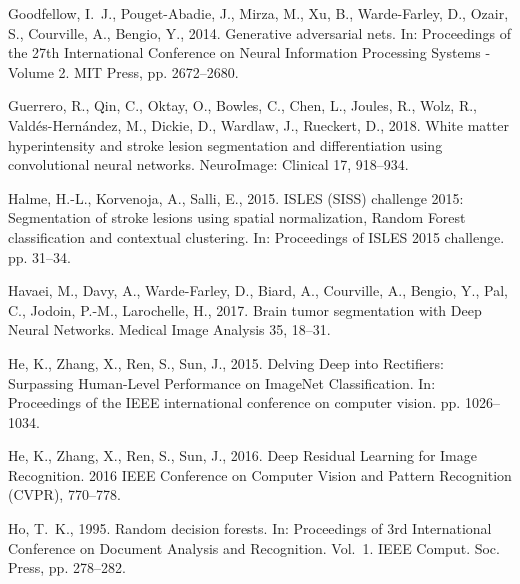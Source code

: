 \documentclass[letterpaper,final,authoryear,3p,times,twocolumn]{elsarticle}
\begin{document}
\begin{thebibliography}{36}
Goodfellow, I.~J., Pouget-Abadie, J., Mirza, M., Xu, B., Warde-Farley, D.,
  Ozair, S., Courville, A., Bengio, Y., 2014. {Generative adversarial nets}.
  In: Proceedings of the 27th International Conference on Neural Information
  Processing Systems - Volume 2. MIT Press, pp. 2672--2680.

Guerrero, R., Qin, C., Oktay, O., Bowles, C., Chen, L., Joules, R., Wolz, R.,
  Vald{\'{e}}s-Hern{\'{a}}ndez, M., Dickie, D., Wardlaw, J., Rueckert, D.,
  2018. {White matter hyperintensity and stroke lesion segmentation and
  differentiation using convolutional neural networks}. NeuroImage: Clinical
  17, 918--934.

Halme, H.-L., Korvenoja, A., Salli, E., 2015. {ISLES (SISS) challenge 2015:
  Segmentation of stroke lesions using spatial normalization, Random Forest
  classification and contextual clustering}. In: Proceedings of ISLES 2015
  challenge. pp. 31--34.

Havaei, M., Davy, A., Warde-Farley, D., Biard, A., Courville, A., Bengio, Y.,
  Pal, C., Jodoin, P.-M., Larochelle, H., 2017. {Brain tumor segmentation with
  Deep Neural Networks}. Medical Image Analysis 35, 18--31.

He, K., Zhang, X., Ren, S., Sun, J., 2015. {Delving Deep into Rectifiers:
  Surpassing Human-Level Performance on ImageNet Classification}. In:
  Proceedings of the IEEE international conference on computer vision. pp.
  1026--1034.

He, K., Zhang, X., Ren, S., Sun, J., 2016. {Deep Residual Learning for Image
  Recognition}. 2016 IEEE Conference on Computer Vision and Pattern Recognition
  (CVPR), 770--778.

Ho, T.~K., 1995. {Random decision forests}. In: Proceedings of 3rd
  International Conference on Document Analysis and Recognition. Vol.~1. IEEE
  Comput. Soc. Press, pp. 278--282.


\end{thebibliography}
\end{document}
